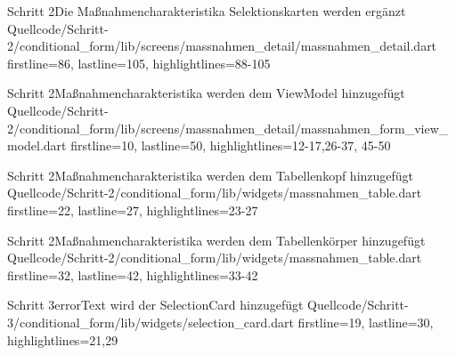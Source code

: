 \begin{alexlisting}{Schritt 2}{Die Maßnahmencharakteristika Selektionskarten werden ergänzt}
  {Quellcode/Schritt-2/conditional_form/lib/screens/massnahmen_detail/massnahmen_detail.dart}
  {firstline=86, lastline=105, highlightlines={88-105}}
  \label{lst:Schritt2MaßnahmencharakteristikaSelektionskartenWerdenErgaenzt}
\end{alexlisting}




\begin{alexlisting}{Schritt 2}{Maßnahmencharakteristika werden dem ViewModel hinzugefügt}
  {Quellcode/Schritt-2/conditional_form/lib/screens/massnahmen_detail/massnahmen_form_view_model.dart}
  {firstline=10, lastline=50, highlightlines={12-17,26-37, 45-50}}
  \label{lst:Schritt2MaßnahmencharakteristikaWerdenDemViewModelHinzugefuegt}
\end{alexlisting}






\begin{alexlisting}{Schritt 2}{Maßnahmencharakteristika werden dem Tabellenkopf hinzugefügt}
  {Quellcode/Schritt-2/conditional_form/lib/widgets/massnahmen_table.dart}
  {firstline=22, lastline=27, highlightlines={23-27}}
  \label{lst:Schritt2MaßnahmencharakteristikaEerdenDemTabellenkopfHinzugefuegt}
\end{alexlisting}


\begin{alexlisting}{Schritt 2}{Maßnahmencharakteristika werden dem Tabellenkörper hinzugefügt}
  {Quellcode/Schritt-2/conditional_form/lib/widgets/massnahmen_table.dart}
  {firstline=32, lastline=42, highlightlines={33-42}}
  \label{lst:Schritt2MaßnahmencharakteristikaWerdenDemTabellenkoerperHinzugefuegt}
\end{alexlisting}


\begin{alexlisting}{Schritt 3}{errorText wird der SelectionCard hinzugefügt}
  {Quellcode/Schritt-3/conditional_form/lib/widgets/selection_card.dart}
  {firstline=19, lastline=30, highlightlines={21,29}}
  \label{lst:Schritt3DieMassnahmencharakteristikaSelektionskartenWerdenergaenzt}
\end{alexlisting}